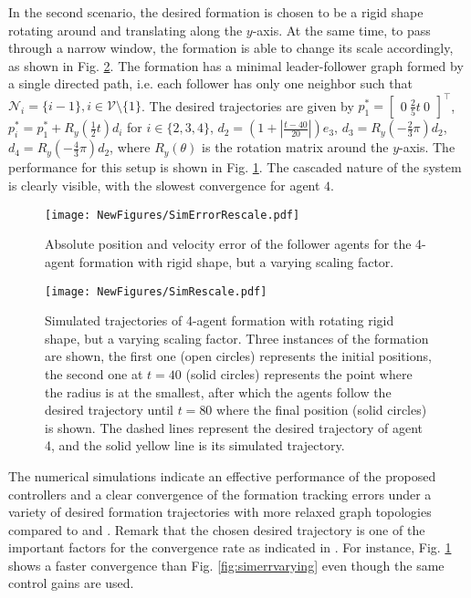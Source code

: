 In the second scenario, the desired formation is chosen to be a rigid shape rotating around and translating along the $y$-axis. At the same time, to pass through a narrow window, the formation is able to change its scale accordingly, as shown in Fig. \ref{fig:simrescale}. The formation has a minimal leader-follower graph formed by a single directed path, i.e. each follower has only one neighbor such that $\mathcal{N}_i = \{i - 1\}, i\in \mathcal{V}\setminus\{1\}$. The desired trajectories are given by $p_1^*{=}\begin{bmatrix} 0 ~ \frac{2}{5}t ~ 0\end{bmatrix}^\top$, $p_i^* = p_1^* + R_y(\frac{1}{2}t)d_i$ for $i\in\{2,3,4\}$, $d_2 = (1{+}|\frac{t-40}{20}| ) e_3$, $d_3 = R_y({-}\frac{2}{3}\pi) d_2$, $d_4 = R_y({-}\frac{4}{3}\pi) d_2$, where $R_y(\theta)$ is the rotation matrix around the $y$-axis.
The performance for this setup is shown in Fig. \ref{fig:simerrrescale}. The cascaded nature of the system is clearly visible, with the slowest convergence for agent $4$.
\begin{figure}%
	\centering
	\texttt{[image: NewFigures/SimErrorRescale.pdf]}
    \vspace{-0.4cm}
	\caption{Absolute position and velocity error of the follower agents for the 4-agent formation with rigid shape, but a varying scaling factor.}
	\label{fig:simerrrescale}
\end{figure}
\begin{figure}
    \vspace{0.2cm}
    \centering
    \texttt{[image: NewFigures/SimRescale.pdf]}
    \vspace{-0.25cm}
    \caption{Simulated trajectories of 4-agent formation with rotating rigid shape, but a varying scaling factor. Three instances of the formation are shown, the first one (open circles) represents the initial positions, the second one at $t=40$ (solid circles) represents the point where the radius is at the smallest, after which the agents follow the desired trajectory until $t=80$ where the final position (solid circles) is shown. The dashed lines represent the desired trajectory of agent 4, and the solid yellow line is its simulated trajectory.}
    \label{fig:simrescale}
\end{figure}
The numerical simulations indicate an effective performance of the proposed controllers and a clear convergence of the formation tracking errors under a variety of desired formation trajectories with more relaxed graph topologies compared to \cite{schiano2016rigidity} and  \cite{erskine2021model}. Remark that the chosen desired trajectory is one of the important factors for the convergence rate as indicated in \cite[Theorem 3]{tang2021formation}. For instance, Fig. \ref{fig:simerrrescale} shows a faster convergence than Fig. \ref{fig:simerrvarying} even though the same control gains are used.
